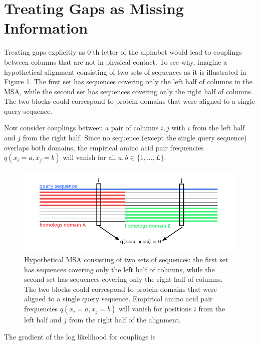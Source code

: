 \documentclass[12pt,a4paper,twoside]{book}
\newcommand{\eq}{\!=\!}
\theoremstyle{definition}
\theoremstyle{definition}
\theoremstyle{remark}
\begin{document}
\section{Treating Gaps as Missing Information}\label{gap-treatment}

Treating gaps explicitly as 0'th letter of the alphabet would lead to
couplings between columns that are not in physical contact. To see why,
imagine a hypothetical alignment consisting of two sets of sequences as
it is illustrated in Figure \ref{fig:gap-treatment}. The first set has
sequences covering only the left half of columns in the MSA, while the
second set has sequences covering only the right half of columns. The
two blocks could correspond to protein domains that were aligned to a
single query sequence.

Now consider couplings between a pair of columns \(i, j\) with \(i\)
from the left half and \(j\) from the right half. Since no sequence
(except the single query sequence) overlaps both domains, the empirical
amino acid pair frequencies \(q(x_i = a, x_j = b)\) will vanish for all
\(a, b \in \{1,... , L\}\).










\begin{figure}
\centering
\includegraphics{img/gap_treatment.png}
\caption{\label{fig:gap-treatment}Hypothetical \protect\hyperlink{abbrev}{MSA}
consisting of two sets of sequences: the first set has sequences
covering only the left half of columns, while the second set has
sequences covering only the right half of columns. The two blocks could
correspond to protein domains that were aligned to a single query
sequence. Empirical amino acid pair frequencies
\(q(x_i \eq a, x_j \eq b)\) will vanish for positions \(i\) from the
left half and \(j\) from the right half of the alignment.}
\end{figure}

The gradient of the log likelihood for couplings is
\end{document}
